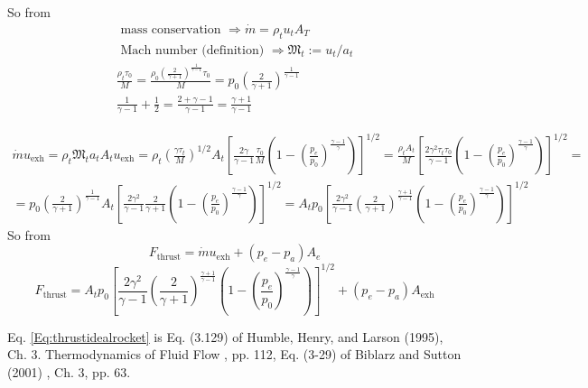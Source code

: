 \documentclass[10pt]{amsart}
\begin{document}
\begin{multicols*}{2}
So from
\[
\begin{gathered}
  \text{ mass conservation } \Longrightarrow  \dot{m} = \rho_t u_t A_T \\
  \text{ Mach number (definition) } \Longrightarrow \mathfrak{M}_t := u_t/a_t \\
  \frac{ \rho_t \tau_0}{M} = \frac{ \rho_0 \left( \frac{2}{\gamma +1} \right)^{\frac{1}{\gamma -1} } \tau_0 }{ M} = p_0 \left( \frac{2}{\gamma +1 } \right)^{ \frac{1}{\gamma -1} } \\
  \frac{1}{\gamma -1} + \frac{1}{2} = \frac{ 2 + \gamma - 1}{ \gamma -1} = \frac{ \gamma +1}{ \gamma -1} 
  \end{gathered}
\]

\[
\begin{gathered}
  \dot{m} u_{\text{exh}} = \rho_t \mathfrak{M}_t a_t A_t u_{\text{exh}} = \rho_t \left( \frac{\gamma \tau_t }{M} \right)^{1/2} A_t \left[ \frac{ 2\gamma }{\gamma -1} \frac{ \tau_0 }{M} \left( 1 - \left( \frac{p_e}{p_0} \right)^{\frac{\gamma -1}{\gamma } } \right) \right]^{1/2} = \frac{ \rho_t A_t }{M} \left[ \frac{ 2\gamma^2 \tau_t\tau_0 }{ \gamma -1} \left( 1 - \left( \frac{p_e}{p_0} \right)^{\frac{ \gamma -1}{\gamma } } \right) \right]^{1/2} = \\
  = p_0 \left( \frac{2}{\gamma + 1} \right)^{\frac{1}{\gamma -1 } } A_t \left[ \frac{2 \gamma^2}{ \gamma -1} \frac{ 2 }{ \gamma + 1} \left( 1 - \left( \frac{p_e}{p_0} \right)^{ \frac{\gamma -1}{\gamma } } \right) \right]^{1/2} = A_t p_0 \left[ \frac{ 2\gamma^2 }{ \gamma -1 } \left( \frac{2}{ \gamma + 1} \right)^{ \frac{ \gamma + 1}{ \gamma -1 } } \left( 1 - \left( \frac{p_e}{ p_0 } \right)^{ \frac{\gamma -1}{ \gamma } }\right) \right]^{1/2}
\end{gathered}
\]
So from
\[
F_{\text{thrust}} = \dot{m} u_{\text{exh}} + (p_e - p_a) A_e
\]
\begin{equation} \label{Eq:thrustidealrocket}
  \boxed{ 
  F_{\text{thrust}} = A_t p_0 \left[ \frac{ 2\gamma^2 }{ \gamma -1 } \left( \frac{2}{ \gamma + 1} \right)^{ \frac{ \gamma + 1}{ \gamma -1 } } \left( 1 - \left( \frac{p_e}{ p_0 } \right)^{ \frac{\gamma -1}{ \gamma } }\right) \right]^{1/2} + (p_e - p_a) A_{\text{exh}}  }
  \end{equation}

Eq. \ref{Eq:thrustidealrocket} is Eq. (3.129) of Humble, Henry, and Larson (1995), Ch. 3. Thermodynamics of Fluid Flow \cite{HHL1995}, pp. 112, Eq. (3-29) of Biblarz and Sutton (2001) \cite{GSuttonOBiblarz2001}, Ch. 3, pp. 63.  







\end{multicols*}
\end{document}
